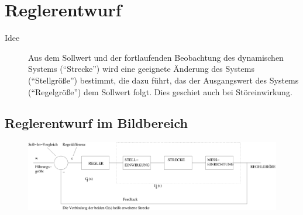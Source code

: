 \documentclass[12pt,a4paper,ngerman]{scrartcl}
\begin{document}
\section{Reglerentwurf}

\begin{description}
\item[Idee] Aus dem Sollwert und der fortlaufenden Beobachtung des dynamischen Systems (``Strecke'') wird eine geeignete Änderung des Systems (``Stellgröße'') bestimmt, die dazu führt, das der Ausgangswert des Systems (``Regelgröße'') dem Sollwert folgt. Dies geschiet auch bei Störeinwirkung.
\end{description}

\subsection{Reglerentwurf im Bildbereich}
\begin{figure}[H]
  \centering
\includegraphics[width=\linewidth]{sysregel_regler}  

\end{figure}
\end{document}
